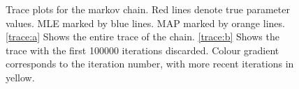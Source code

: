 \documentclass{report}
\theoremstyle{definition}
\begin{document}
\begin{figure}[H]
  \centering
  \centering
  \centering
  \caption{Trace plots for the markov chain. Red lines denote true parameter values. MLE marked by blue lines. MAP marked by orange lines. \ref{trace:a} Shows the entire trace of the chain. \ref{trace:b} Shows the trace with the first 100000 iterations discarded. Colour gradient corresponds to the iteration number, with more recent iterations in yellow.}
  \label{fig:trace}
\end{figure}
\end{document}
